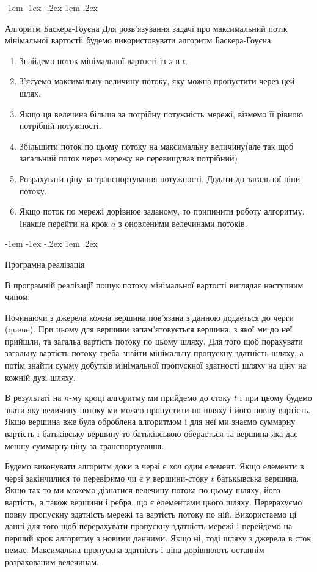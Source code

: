 \documentclass[a4paper,14pt,russian,ukrainian,oneside,final]{extreport}
\makeatletter
\newlength{\fivecharsapprox}
\renewcommand\subsection{%
  \@startsection{subsection}{2}%
    {\fivecharsapprox}%
    {-1em \@plus -1ex \@minus -.2ex}%
    {1em \@plus .2ex}%
    {\raggedright\hyphenpenalty=10000\normalfont\normalsize\bfseries}}
\makeatother
\begin{document}
 

\subsection{Алгоритм Баскера-Гоуєна}
Для розв'язування задачі про максимальний потік мінімальної вартостіі будемо використовувати алгоритм Баскера-Гоуєна:
\begin{enumerate}
\item Знайдемо поток мінімальної вартості із $ s $ в $ t $.
\item З'ясуемо максимальну величину потоку, яку можна пропустити через цей шлях.
\item Якщо ця велечина більша за потрібну потужність мережі, візмемо її рівною потрібній потужності.
\item 	Збільшити поток по цьому потоку на максимальну величину(але так щоб загальний  поток через мережу не перевищував потрібний)
\item 	Розрахувати ціну за транспортування потужності. Додати до загальної ціни потоку.
\item 	Якщо поток по мережі дорівнюе заданому, то припинити роботу алгоритму. Інакше перейти на крок $a$ з оновленими велечинами потоків.
\end{enumerate}

\subsection{Програмна реалізація}

В програмній реалізації пошук потоку мінімальної вартості виглядає наступним чином:

\indent Починаючи з джерела кожна вершина пов'язана з данною додаеться до черги (queue). При цьому для вершини запам'ятовується  вершина, з якої ми до неї прийшли, та загальа вартість потоку по цьому шляху. Для того щоб порахувати загальну вартість потоку треба  знайти мінімальну пропускну здатність шляху, а потім знайти сумму добутків мінімальної пропускної здатності шляху на ціну на кожній дузі шляху.

\indent В результаті на $n$-му кроці алгоритму ми прийдемо до стоку $t$ і при цьому будемо знати яку величину потоку ми можео пропустити по шляху і його повну вартість. Якщо вершина вже була оброблена алгоритмом і для неї ми знаємо суммарну вартість і батьківську вершину то батьківською оберається та вершина яка дає меншу суммарну  ціну за транспортування.

\indent Будемо виконувати алгоритм доки в черзі є хоч один елемент. Якщо елементи в черзі закінчилися то перевіримо чи є у вершини-стоку $t$ батькывська вершина. Якщо так то ми можемо дізнатися велечину потока по цьому шляху, його вартість, а також вершини і ребра, що є елементами цього шляху. Перерахуємо повну пропускну здатність мережі та вартість потоку по ній. Використаемо ці данні для того щоб перерахувати пропускну здатність мережі і перейдемо на перший крок алгоритму з новими данними. Якщо ні, тоді шляху з джерела в сток немає. Максимальна пропускна здатність і ціна дорівнюють останнім розрахованим велечинам.
\end{document}
